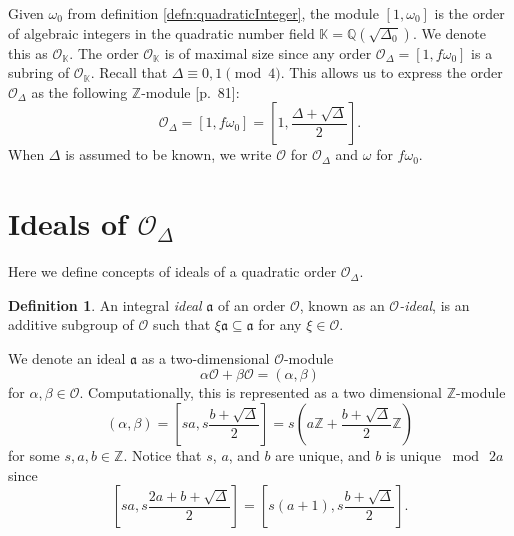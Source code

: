 \documentclass{ucalgthes1}
\theoremstyle{plain}
\theoremstyle{definition}
\newtheorem{defn}[thm]{Definition}
\newcommand{\KK}{\mathbb{K}}
\newcommand{\OO}{\mathcal{O}}
\newcommand{\ZZ}{\mathbb{Z}}
\newcommand{\QQ}{\mathbb{Q}}
\begin{document}
\bigbreak
Given $\omega_0$ from definition \ref{defn:quadraticInteger}, the module $[1, \omega_0]$ is the order of algebraic integers in the quadratic number field $\KK=\QQ(\sqrt{\Delta_0})$.  We denote this as $\OO_{\KK}$.  The order $\OO_\KK$ is of maximal size since any order $\OO_\Delta = [1,f\omega_0]$ is a subring of $\OO_\KK$.  Recall that $\Delta \equiv 0,1 \pmod 4$.  This allows us to express the order $\OO_\Delta$ as the following $\ZZ$-module \cite{Jac09}[p.~81]:
\[
	\OO_\Delta = [1,f\omega_0] = \left[1, \frac{\Delta + \sqrt{\Delta}}{2} \right].
\]
When $\Delta$ is assumed to be known, we write $\OO$ for $\OO_\Delta$ and $\omega$ for $f\omega_0$.


\bigbreak
\section{Ideals of $\OO_\Delta$}

Here we define concepts of ideals of a quadratic order $\OO_\Delta$.

\begin{defn}
An integral \emph{ideal} $\mathfrak{a}$ of an order $\OO$, known as an \emph{$\OO$-ideal}, is an additive subgroup of $\OO$ such that $\xi \mathfrak{a} \subseteq \mathfrak{a}$ for any $\xi \in \OO$.
\end{defn}

We denote an ideal $\mathfrak{a}$ as a two-dimensional $\OO$-module
\[
	\alpha \OO + \beta \OO = (\alpha, \beta)
\]
for $\alpha, \beta \in \OO$.  Computationally, this is represented as a two dimensional $\ZZ$-module
\begin{equation}
\label{eq:idealZModule}
	(\alpha, \beta) = \left[sa, s \frac{b+ \sqrt{\Delta}}{2} \right] = s \left(a \ZZ + \frac{b + \sqrt{\Delta}}{2} \ZZ \right)
\end{equation}
for some $s, a, b \in \ZZ$.  Notice that $s$, $a$, and $b$ are unique, and $b$ is unique $\bmod~2a$ since
\begin{equation*}
	\left[sa, s\frac{2a+b+\sqrt{\Delta}}{2}\right] = \left[s(a+1), s\frac{b+\sqrt{\Delta}}{2}\right].
\end{equation*}
\end{document}
